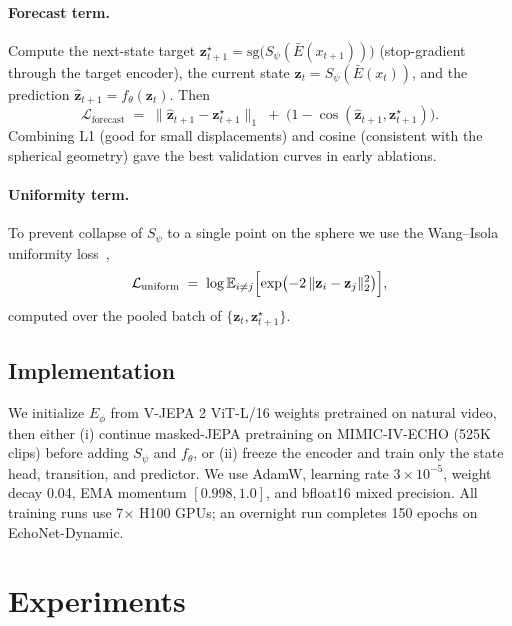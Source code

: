 \documentclass[runningheads]{llncs}
\begin{document}
\paragraph{Forecast term.}
Compute the next-state target
$\mathbf{z}^{\star}_{t+1} = \mathrm{sg}\bigl(S_\psi(\bar E(x_{t+1}))\bigr)$
(stop-gradient through the target encoder), the current state
$\mathbf{z}_t = S_\psi(\bar E(x_t))$, and the prediction
$\hat{\mathbf{z}}_{t+1} = f_\theta(\mathbf{z}_t)$. Then
\begin{equation}
\mathcal{L}_{\mathrm{forecast}} \;=\;
\bigl\lVert \hat{\mathbf{z}}_{t+1} - \mathbf{z}^{\star}_{t+1} \bigr\rVert_1
\;+\; \bigl(1 - \cos(\hat{\mathbf{z}}_{t+1}, \mathbf{z}^{\star}_{t+1})\bigr).
\end{equation}
Combining L1 (good for small displacements) and cosine (consistent with the
spherical geometry) gave the best validation curves in early ablations.

\paragraph{Uniformity term.}
To prevent collapse of $S_\psi$ to a single point on the sphere we use the
Wang--Isola uniformity loss~\cite{wang2020uniformity},
\begin{equation}
\mathcal{L}_{\mathrm{uniform}} \;=\;
\log \mathbb{E}_{i\neq j}\Bigl[\exp\bigl(-2\,\lVert \mathbf{z}_i - \mathbf{z}_j \rVert_2^2\bigr)\Bigr],
\end{equation}
computed over the pooled batch of $\{\mathbf{z}_t, \mathbf{z}^{\star}_{t+1}\}$.

\subsection{Implementation}

We initialize $E_\phi$ from V-JEPA 2 ViT-L/16 weights pretrained on natural
video, then either (i) continue masked-JEPA pretraining on MIMIC-IV-ECHO
(525K clips) before adding $S_\psi$ and $f_\theta$, or (ii) freeze the
encoder and train only the state head, transition, and predictor. We use
AdamW, learning rate $3\!\times\!10^{-5}$, weight decay 0.04, EMA momentum
$[0.998, 1.0]$, and bfloat16 mixed precision. All training runs use 7$\times$
H100 GPUs; an overnight run completes 150 epochs on EchoNet-Dynamic.

\section{Experiments}\label{sec:exp}
\end{document}
